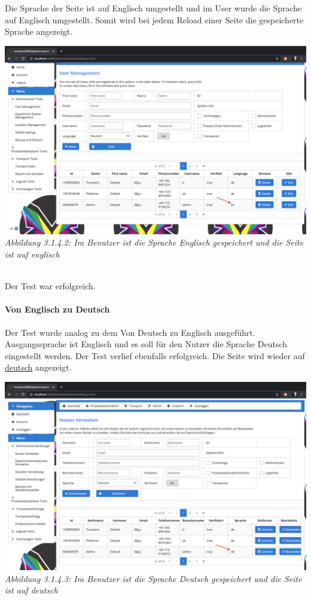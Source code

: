 \documentclass[enabledeprecatedfontcommands,fontsize=12pt,paper=a4,twoside]{scrartcl}
\begin{document}
Die Sprache der Seite ist auf Englisch umgestellt und im User wurde die Sprache auf Englisch umgestellt. Somit wird bei jedem Reload einer Seite die gespeicherte Sprache angezeigt. 

\hypertarget{sc3.1.4.2.1}{
\includegraphics[width=1\textwidth]{Screenshots/31142.png}
\textit{Abbildung 3.1.4.2: Im Benutzer ist die Sprache Englisch gespeichert und die Seite ist auf englisch}
} \\

Der Test war erfolgreich. 

\paragraph{Von Englisch zu Deutsch}

Der Test wurde analog zu dem Von Deutsch zu Englisch ausgeführt. Ausgangssprache ist Englisch und es soll für den Nutzer die Sprache Deutsch eingestellt werden. Der Test verlief ebenfalls erfolgreich. Die Seite wird wieder auf \hyperlink{sc3.1.4.3.1}{deutsch} angezeigt.

\hypertarget{sc3.1.4.3.1}{
\includegraphics[width=1\textwidth]{Screenshots/31143.png}
\textit{Abbildung 3.1.4.3: Im Benutzer ist die Sprache Deutsch gespeichert und die Seite ist auf deutsch}
} \\
\end{document}

